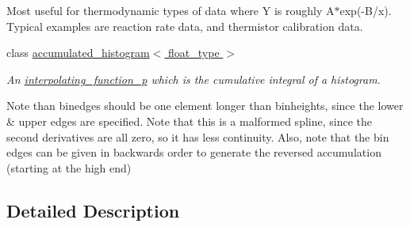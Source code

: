 \begin{DoxyCompactItemize}
\begin{DoxyCompactList}
Most useful for thermodynamic types of data where Y is roughly A$\ast$exp(-\/\-B/x). Typical examples are reaction rate data, and thermistor calibration data. \end{DoxyCompactList}\item 
class \hyperlink{classaccumulated__histogram}{accumulated\-\_\-histogram$<$ float\-\_\-type $>$}
\begin{DoxyCompactList}\small\item\em An \hyperlink{classinterpolating__function__p}{interpolating\-\_\-function\-\_\-p} which is the cumulative integral of a histogram.

Note than binedges should be one element longer than binheights, since the lower \& upper edges are specified. Note that this is a malformed spline, since the second derivatives are all zero, so it has less continuity. Also, note that the bin edges can be given in backwards order to generate the reversed accumulation (starting at the high end) \end{DoxyCompactList}\end{DoxyCompactItemize}


\subsection{Detailed Description}
